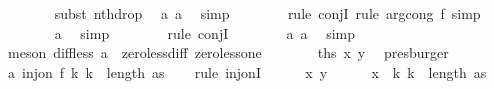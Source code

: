 \begin{isabellebody}
\ \ \ \ \ \ \isamarkupfalse%
\ {\isacharparenleft}{\kern0pt}subst\ nth{\isacharunderscore}{\kern0pt}drop{\isacharparenright}{\kern0pt}\ \isamarkupfalse%
\ a{}{\isacharunderscore}{\kern0pt}{}\ a{}{\isacharunderscore}{\kern0pt}{}\ \isamarkupfalse%
\ simp\isanewline
\ \ \ \ \ \ \isamarkupfalse%
\ {\isacharparenleft}{\kern0pt}rule\ conjI{\isacharcomma}{\kern0pt}\ rule\ arg{\isacharunderscore}{\kern0pt}cong{}{\isacharbrackleft}{\kern0pt}\ f{\isacharequal}{\kern0pt}{\isachardoublequoteopen}{\isacharparenleft}{\kern0pt}{\isacharbang}{\kern0pt}{\isacharparenright}{\kern0pt}{\isachardoublequoteclose}{\isacharbrackright}{\kern0pt}{\isacharcomma}{\kern0pt}\ simp{\isacharparenright}{\kern0pt}\isanewline
\ \ \ \ \ \ \isamarkupfalse%
\ a{}{\isacharunderscore}{\kern0pt}{}\ \isamarkupfalse%
\ simp\isanewline
\ \ \ \ \ \ \isamarkupfalse%
\ {\isacharparenleft}{\kern0pt}rule\ conjI{\isacharparenright}{\kern0pt}\isanewline
\ \ \ \ \ \ \isamarkupfalse%
\ a{}{\isacharunderscore}{\kern0pt}{}\ a{}{\isacharunderscore}{\kern0pt}{}\ \isamarkupfalse%
\ simp\isanewline
\ \ \ \ \ \ \isamarkupfalse%
\ {\isacharparenleft}{\kern0pt}meson\ diff{\isacharunderscore}{\kern0pt}less\ a{}{\isacharunderscore}{\kern0pt}{}\ \ zero{\isacharunderscore}{\kern0pt}less{\isacharunderscore}{\kern0pt}diff\ zero{\isacharunderscore}{\kern0pt}less{\isacharunderscore}{\kern0pt}one{\isacharparenright}{\kern0pt}\isanewline
\ \ \ \ \isamarkupfalse%
\ \isamarkupfalse%
\ {\isachardoublequoteopen}{\isacharquery}{\kern0pt}ths\ x\ y{\isachardoublequoteclose}\ \isamarkupfalse%
\ presburger\isanewline
\ \ \isamarkupfalse%
\isanewline
\isanewline
\ \ \isamarkupfalse%
\ a{}{\isacharcolon}{\kern0pt}\ {\isachardoublequoteopen}inj{\isacharunderscore}{\kern0pt}on\ f\ {\isacharbraceleft}{\kern0pt}k{\isachardot}{\kern0pt}\ k\ {\isacharless}{\kern0pt}\ length\ as{\isacharbraceright}{\kern0pt}{\isachardoublequoteclose}\isanewline
\ \ \isamarkupfalse%
\ {\isacharparenleft}{\kern0pt}rule\ inj{\isacharunderscore}{\kern0pt}onI{\isacharparenright}{\kern0pt}\isanewline
\ \ \ \ \isamarkupfalse%
\ x\ y\isanewline
\ \ \ \ \isamarkupfalse%
\ {\isachardoublequoteopen}x\ {\isasymin}\ {\isacharbraceleft}{\kern0pt}k{\isachardot}{\kern0pt}\ k\ {\isacharless}{\kern0pt}\ length\ as{\isacharbraceright}{\kern0pt}{\isachardoublequoteclose}\isanewline

\end{isabellebody}

